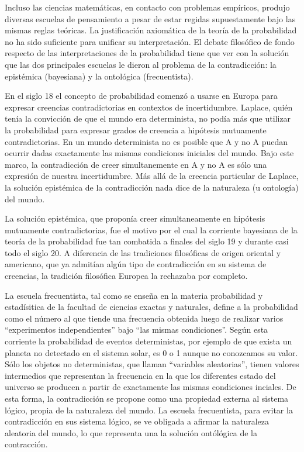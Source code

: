 \documentclass[a4paper,10pt]{book}
\theoremstyle{definition}
\begin{document}
Incluso las ciencias matem\'aticas, en contacto con problemas emp\'iricos, produjo diversas escuelas de pensamiento a pesar de estar regidas supuestamente bajo las mismas reglas te\'oricas.
%
La justificaci\'on axiom\'atica de la teor\'ia de la probabilidad no ha sido suficiente para unificar su interpretaci\'on.
%
El debate filos\'ofico de fondo respecto de las interpretaciones de la probabilidad tiene que ver con la soluci\'on que las dos principales escuelas le dieron al problema de la contradicci\'on: la epist\'emica (bayesiana) y la ontol\'ogica (frecuentista).


En el siglo 18 el concepto de probabilidad comenz\'o a usarse en Europa para expresar creencias contradictorias en contextos de incertidumbre.
%
Laplace, qui\'en ten\'ia la convicci\'on de que el mundo era determinista, no pod\'ia m\'as que utilizar la probabilidad para expresar grados de creencia a hip\'otesis mutuamente contradictorias.
%
En un mundo determinista no es posible que A y no A puedan ocurrir dadas exactamente las mismas condiciones iniciales del mundo.
%
Bajo este marco, la contradicci\'on de creer simultanemente en A y no A es s\'olo una expresi\'on de nuestra incertidumbre.
%
M\'as all\'a de la creencia particular de Laplace, la soluci\'on epist\'emica de la contradicci\'on nada dice de la naturaleza (u ontolog\'ia) del mundo.


La soluci\'on epist\'emica, que propon\'ia creer simultaneamente en hip\'otesis mutuamente contradictorias, fue el motivo por el cual la corriente bayesiana de la teor\'ia de la probabilidad fue tan combatida a finales del siglo 19 y durante casi todo el siglo 20.
%
A diferencia de las tradiciones filos\'oficas de origen oriental y americano, que ya admit\'ian algún tipo de contradicci\'on en su sistema de creencias, la tradici\'on filos\'ofica Europea la rechazaba por completo.


La escuela frecuentista, tal como se ense\~na en la materia probabilidad y estad\'isitica de la facultad de ciencias exactas y naturales, define a la probabilidad como el número al que tiende una frecuencia obtenida luego de realizar varios ``experimentos independientes'' bajo ``las mismas condiciones''.
%
Según esta corriente la probabilidad de eventos deterministas, por ejemplo de que exista un planeta no detectado en el sistema solar, es 0 o 1 aunque no conozcamos su valor.
%
S\'olo los objetos no deterministas, que llaman ``variables aleatorias'', tienen valores intermedios que representan la frecuencia en la que los diferentes estado del universo se producen a partir de exactamente las mismas condiciones inciales.
%
De esta forma, la contradicci\'on se propone como una propiedad externa al sistema l\'ogico, propia de la naturaleza del mundo.
%
La escuela frecuentista, para evitar la contradicci\'on en sus sistema l\'ogico, se ve obligada a afirmar la naturaleza aleatoria del mundo, lo que representa una la soluci\'on ont\'ol\'ogica de la contracci\'on.
\end{document}
